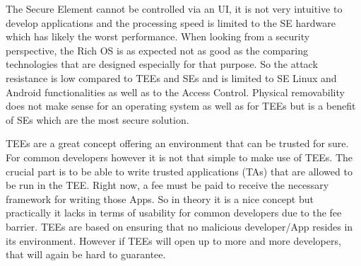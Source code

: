 The Secure Element cannot be controlled via an UI, it is not very intuitive
to develop applications and the processing speed is limited to the SE hardware
which has likely the worst performance. When looking from a security perspective, the Rich OS is as expected not as good as the comparing technologies that are designed especially for that purpose. So the attack resistance is  low compared to TEEs and SEs and is limited to SE Linux and Android functionalities as well as to the Access Control. Physical removability
does not make sense for an operating system as well as for TEEs but
is a benefit of SEs which are the most secure solution.

TEEs are a great concept offering an environment that can be trusted for sure.
For common developers however it is not that simple to make use of TEEs.
The crucial part is to be able to write trusted applications (TAs) that are
allowed to be run in the TEE. Right now, a fee must be paid to receive the
necessary framework for writing those Apps. So in theory it is a nice concept
but practically it lacks in terms of usability for common developers due
to the fee barrier. TEEs are based on ensuring that no malicious developer/App resides in its environment. However if TEEs will open up to more and more developers, that will again be hard to guarantee.




